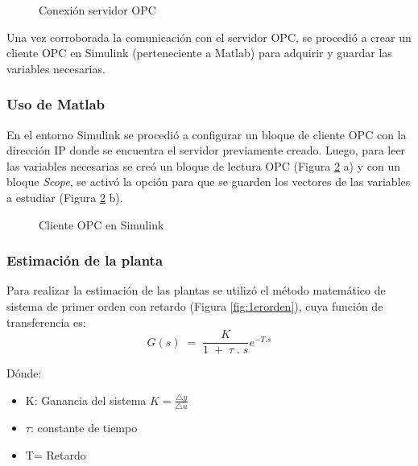 \begin{figure}[htbp]
	\centering
	\caption{Conexión servidor OPC} \label{fig:opc2}
\end{figure}

Una vez corroborada la comunicación con el servidor OPC, se procedió a crear un cliente OPC en Simulink (perteneciente a Matlab) para adquirir y guardar las variables necesarias. 


\subsubsection{Uso de Matlab}
En el entorno Simulink se procedió a configurar un bloque de cliente OPC con la dirección IP donde se encuentra el servidor previamente creado. Luego, para leer las variables necesarias se creó un bloque de lectura OPC (Figura \ref{fig:opcsimu} a) y con un bloque \textit{Scope}, se activó la opción para que se guarden los vectores de las variables a estudiar (Figura \ref{fig:opcsimu} b). 


\begin{figure}[htbp]
	\centering
	\caption{Cliente OPC en Simulink} \label{fig:opcsimu}
\end{figure}



\subsubsection{Estimación de la planta}

Para realizar la estimación de las plantas se utilizó el método matemático de sistema de primer orden con retardo (Figura \ref{fig:1erorden}), cuya función de transferencia es: \\
\begin{equation}
	G(s)\;=\;\frac K{1\;+\;\tau\;.\;s}e^{-T.s}
\end{equation}


Dónde:
\begin{itemize}
	\item K:  Ganancia del sistema $K = \frac{\triangle y}{\triangle u}$
	\item $\tau$: constante de tiempo
	\item T= Retardo
\end{itemize}

